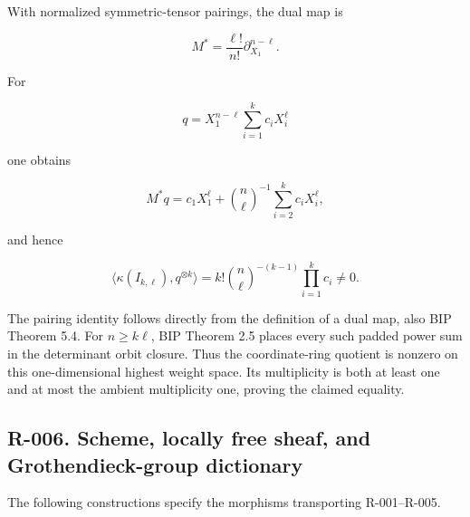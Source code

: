 \documentclass[
  10pt,
]{article}
\begin{document}
With normalized symmetric-tensor pairings, the dual map is

\[
M^*=\frac{\ell!}{n!}\partial_{X_1}^{n-\ell}.
\]

For

\[
q=X_1^{n-\ell}\sum_{i=1}^k c_iX_i^\ell
\]

one obtains

\[
M^*q=c_1X_1^\ell+\binom n\ell^{-1}\sum_{i=2}^k c_iX_i^\ell,
\]

and hence

\[
\boxed{\langle\kappa(I_{k,\ell}),q^{\otimes k}\rangle
=k!\binom n\ell^{-(k-1)}\prod_{i=1}^k c_i\ne0.}
\tag{R-005c}
\]

The pairing identity follows directly from the definition of a dual map,
also BIP Theorem 5.4. For \(n\ge k\ell\), BIP Theorem 2.5 places every
such padded power sum in the determinant orbit closure. Thus the
coordinate-ring quotient is nonzero on this one-dimensional highest
weight space. Its multiplicity is both at least one and at most the
ambient multiplicity one, proving the claimed equality.

\subsection{R-006. Scheme, locally free sheaf, and Grothendieck-group
dictionary}\label{r-006.-scheme-locally-free-sheaf-and-grothendieck-group-dictionary}

The following constructions specify the morphisms transporting
R-001--R-005.
\end{document}
